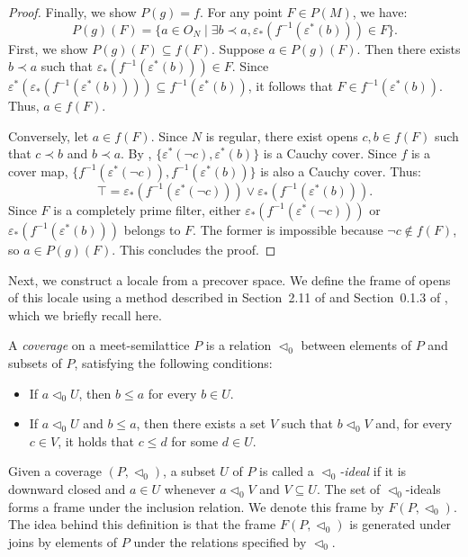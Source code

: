 \documentclass[reqno]{amsart}
\theoremstyle{definition}
\theoremstyle{remark}
\numberwithin{figure}{section}
\newcommand{\rb}{\prec}
\begin{document}
\begin{proof}
Finally, we show $P(g) = f$.
For any point $F \in P(M)$, we have:
\[
P(g)(F) = \{ a \in O_N \mid \exists b \rb a, \varepsilon_*(f^{-1}(\varepsilon^*(b))) \in F \}.
\]
First, we show $P(g)(F) \subseteq f(F)$.
Suppose $a \in P(g)(F)$.
Then there exists $b \rb a$ such that $\varepsilon_*(f^{-1}(\varepsilon^*(b))) \in F$.
Since $\varepsilon^*(\varepsilon_*(f^{-1}(\varepsilon^*(b)))) \subseteq f^{-1}(\varepsilon^*(b))$, it follows that $F \in f^{-1}(\varepsilon^*(b))$.
Thus, $a \in f(F)$.

Conversely, let $a \in f(F)$.
Since $N$ is regular, there exist opens $c,b \in f(F)$ such that $c \rb b$ and $b \rb a$.
By , $\{ \varepsilon^*(\neg c), \varepsilon^*(b) \}$ is a Cauchy cover.
Since $f$ is a cover map, $\{ f^{-1}(\varepsilon^*(\neg c)), f^{-1}(\varepsilon^*(b)) \}$ is also a Cauchy cover.
Thus:
\[
\top = \varepsilon_*(f^{-1}(\varepsilon^*(\neg c))) \vee \varepsilon_*(f^{-1}(\varepsilon^*(b))).
\]
Since $F$ is a completely prime filter, either $\varepsilon_*(f^{-1}(\varepsilon^*(\neg c)))$ or $\varepsilon_*(f^{-1}(\varepsilon^*(b)))$ belongs to $F$.
The former is impossible because $\neg c \notin f(F)$, so $a \in P(g)(F)$.
This concludes the proof.
\end{proof}

Next, we construct a locale from a precover space.
We define the frame of opens of this locale using a method described in Section~2.11 of \cite{stone-spaces} and Section~0.1.3 of \cite{vickers-compact}, which we briefly recall here.

A \emph{coverage} on a meet-semilattice $P$ is a relation $\triangleleft_0$ between elements of $P$ and subsets of $P$, satisfying the following conditions:
\begin{itemize}
\item If $a \triangleleft_0 U$, then $b \leq a$ for every $b \in U$.
\item If $a \triangleleft_0 U$ and $b \leq a$, then there exists a set $V$ such that $b \triangleleft_0 V$ and, for every $c \in V$, it holds that $c \leq d$ for some $d \in U$.
\end{itemize}

Given a coverage $(P,\triangleleft_0)$, a subset $U$ of $P$ is called a \emph{$\triangleleft_0$-ideal} if it is downward closed and $a \in U$ whenever $a \triangleleft_0 V$ and $V \subseteq U$.
The set of $\triangleleft_0$-ideals forms a frame under the inclusion relation.
We denote this frame by $F(P,\triangleleft_0)$.
The idea behind this definition is that the frame $F(P, \triangleleft_0)$ is generated under joins by elements of $P$ under the relations specified by $\triangleleft_0$.
\end{document}
